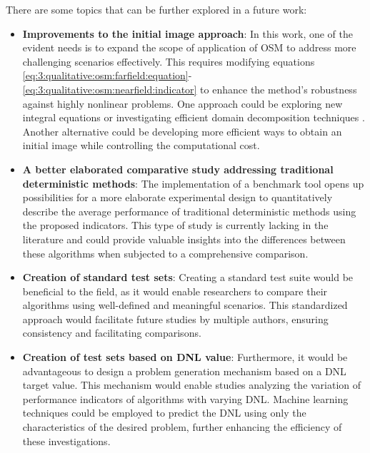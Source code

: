 			
		
		There are some topics that can be further explored in a future work:
		
		\begin{itemize}
			\item\textbf{Improvements to the initial image approach}: In this work, one of the evident needs is to expand the scope of application of OSM to address more challenging scenarios effectively. This requires modifying equations \eqref{eq:3:qualitative:osm:farfield:equation}-\eqref{eq:3:qualitative:osm:nearfield:indicator} to enhance the method's robustness against highly nonlinear problems. One approach could be exploring new integral equations \citep{bevacqua2021quantitative} or investigating efficient domain decomposition techniques \citep{zhang2022iterative}. Another alternative could be developing more efficient ways to obtain an initial image while controlling the computational cost.
			\item\textbf{A better elaborated comparative study addressing traditional deterministic methods}: The implementation of a benchmark tool opens up possibilities for a more elaborate experimental design to quantitatively describe the average performance of traditional deterministic methods using the proposed indicators. This type of study is currently lacking in the literature and could provide valuable insights into the differences between these algorithms when subjected to a comprehensive comparison.
			\item\textbf{Creation of standard test sets}: Creating a standard test suite would be beneficial to the field, as it would enable researchers to compare their algorithms using well-defined and meaningful scenarios. This standardized approach would facilitate future studies by multiple authors, ensuring consistency and facilitating comparisons.
			\item\textbf{Creation of test sets based on DNL value}: Furthermore, it would be advantageous to design a problem generation mechanism based on a DNL target value. This mechanism would enable studies analyzing the variation of performance indicators of algorithms with varying DNL. Machine learning techniques could be employed to predict the DNL using only the characteristics of the desired problem, further enhancing the efficiency of these investigations.

\end{itemize}
